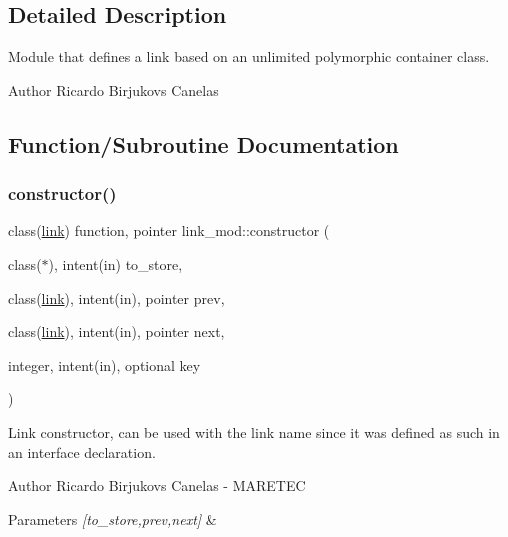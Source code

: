 \subsection{Detailed Description}
Module that defines a link based on an unlimited polymorphic container class. 

\begin{DoxyAuthor}{Author}
Ricardo Birjukovs Canelas 
\end{DoxyAuthor}


\subsection{Function/\+Subroutine Documentation}
\mbox{\label{namespacelink__mod_ac5b4f1702d8edb10a4559f6f371dc797}} 
\subsubsection{\texorpdfstring{constructor()}{constructor()}}
{\footnotesize\ttfamily class(\mbox{\hyperlink{structlink__mod_1_1link}{link}}) function, pointer link\+\_\+mod\+::constructor (\begin{DoxyParamCaption}\item[{class($\ast$), intent(in)}]{to\+\_\+store,  }\item[{class(\mbox{\hyperlink{structlink__mod_1_1link}{link}}), intent(in), pointer}]{prev,  }\item[{class(\mbox{\hyperlink{structlink__mod_1_1link}{link}}), intent(in), pointer}]{next,  }\item[{integer, intent(in), optional}]{key }\end{DoxyParamCaption})\hspace{0.3cm}{\ttfamily [private]}}



Link constructor, can be used with the \textquotesingle{}link\textquotesingle{} name since it was defined as such in an interface declaration. 

\begin{DoxyAuthor}{Author}
Ricardo Birjukovs Canelas -\/ M\+A\+R\+E\+T\+EC 
\end{DoxyAuthor}

\begin{DoxyParams}{Parameters}
{\em \mbox{[}to\+\_\+store,prev,next\mbox{]}} & \\
\hline
\end{DoxyParams}


